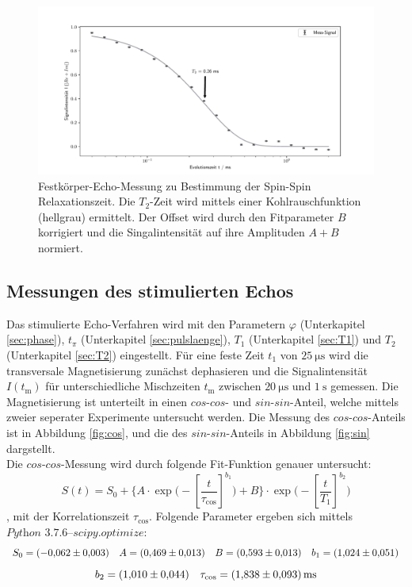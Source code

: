 \begin{figure}[H]
    \centering
    \includegraphics[width=\textwidth]{Auswertung/T2.pdf}
    \caption{Festkörper-Echo-Messung zu Bestimmung der Spin-Spin
    Relaxationszeit. Die $T_2$-Zeit wird mittels einer Kohlrauschfunktion (hellgrau)
    ermittelt. Der Offset wird durch den Fitparameter $B$ korrigiert und die
    Singalintensität auf ihre Amplituden $A+B$ normiert.}
    \label{fig:T2}
\end{figure}

\subsection{Messungen des stimulierten Echos}
\label{sec:stecho}
Das stimulierte Echo-Verfahren wird mit den Parametern $\varphi$ (Unterkapitel
\ref{sec:phase}), $t_{\pi}$ (Unterkapitel \ref{sec:pulslaenge}), $T_1$
(Unterkapitel \ref{sec:T1}) und $T_2$ (Unterkapitel \ref{sec:T2}) eingestellt.
Für eine feste Zeit $t_1$ von $\SI{25}{\micro\second}$ wird die transversale
Magnetisierung zunächst dephasieren
und die Signalintensität $I(t_{\text{m}})$ für unterschiedliche Mischzeiten
$t_{\text{m}}$ zwischen $\SI{20}{\micro\second}$ und $\SI{1}{\second}$ gemessen.
Die Magnetisierung ist unterteilt in einen $cos$-$cos$- und $sin$-$sin$-Anteil, welche
mittels zweier seperater Experimente untersucht werden. Die Messung des
$cos$-$cos$-Anteils ist in Abbildung \ref{fig:cos}, und die des $sin$-$sin$-Anteils
in Abbildung \ref{fig:sin} dargstellt.\\
Die $cos$-$cos$-Messung wird durch folgende Fit-Funktion genauer untersucht:
\begin{equation*}
  S(t) = S_0 + \biggl\{
  A \cdot \exp\biggl(-\left[\frac{t}{\tau_{\text{cos}}} \right]^{b_1}
  \biggr) + B
  \biggr\} \cdot
  \exp\biggl(-\left[\frac{t}{T_1} \right]^{b_2}
  \biggr)
\end{equation*}
\noindent,
mit der Korrelationszeit $\tau_{\text{cos}}$. Folgende Parameter ergeben sich
mittels $\textit{Python 3.7.6--scipy.optimize}$:
\begin{equation*}
  S_0 = \SI{-0.062\pm0.003}{}
  \quad
  A   = \SI{0.469\pm0.013}{}
  \quad
  B   = \SI{0.593\pm0.013}{}
  \quad
  b_1 = \SI{1.024\pm0.051}{}
\end{equation*}
\begin{equation*}
  b_2 = \SI{1.010\pm0.044}{}
  \quad
  \tau_{\text{cos}} = \SI{1,838\pm0,093}{\milli\second}
\end{equation*}

